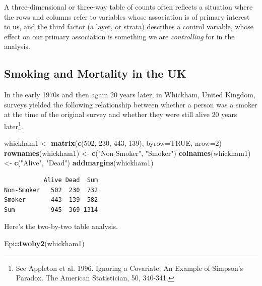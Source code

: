 \documentclass[
]{book}
\newenvironment{Shaded}{\begin{snugshade}}{\end{snugshade}}
\newcommand{\DataTypeTok}[1]{\textcolor[rgb]{0.13,0.29,0.53}{#1}}
\newcommand{\DecValTok}[1]{\textcolor[rgb]{0.00,0.00,0.81}{#1}}
\newcommand{\KeywordTok}[1]{\textcolor[rgb]{0.13,0.29,0.53}{\textbf{#1}}}
\newcommand{\NormalTok}[1]{#1}
\newcommand{\OperatorTok}[1]{\textcolor[rgb]{0.81,0.36,0.00}{\textbf{#1}}}
\newcommand{\OtherTok}[1]{\textcolor[rgb]{0.56,0.35,0.01}{#1}}
\newcommand{\StringTok}[1]{\textcolor[rgb]{0.31,0.60,0.02}{#1}}
\begin{document}
A three-dimensional or three-way table of counts often reflects a situation where the rows and columns refer to variables whose association is of primary interest to us, and the third factor (a layer, or strata) describes a control variable, whose effect on our primary association is something we are \emph{controlling} for in the analysis.

\hypertarget{smoking-and-mortality-in-the-uk}{%
\subsection{Smoking and Mortality in the UK}\label{smoking-and-mortality-in-the-uk}}

In the early 1970s and then again 20 years later, in Whickham, United Kingdom, surveys yielded the following relationship between whether a person was a smoker at the time of the original survey and whether they were still alive 20 years later\footnote{See Appleton et al. 1996. Ignoring a Covariate: An Example of Simpson's Paradox. The American Statistician, 50, 340-341.}.

\begin{Shaded}
\begin{Highlighting}[]
\NormalTok{whickham1 <-}\StringTok{ }\KeywordTok{matrix}\NormalTok{(}\KeywordTok{c}\NormalTok{(}\DecValTok{502}\NormalTok{, }\DecValTok{230}\NormalTok{, }\DecValTok{443}\NormalTok{, }\DecValTok{139}\NormalTok{), }\DataTypeTok{byrow=}\OtherTok{TRUE}\NormalTok{, }\DataTypeTok{nrow=}\DecValTok{2}\NormalTok{)}
\KeywordTok{rownames}\NormalTok{(whickham1) <-}\StringTok{ }\KeywordTok{c}\NormalTok{(}\StringTok{"Non-Smoker"}\NormalTok{, }\StringTok{"Smoker"}\NormalTok{)}
\KeywordTok{colnames}\NormalTok{(whickham1) <-}\StringTok{ }\KeywordTok{c}\NormalTok{(}\StringTok{"Alive"}\NormalTok{, }\StringTok{"Dead"}\NormalTok{)}
\KeywordTok{addmargins}\NormalTok{(whickham1)}
\end{Highlighting}
\end{Shaded}

\begin{verbatim}
           Alive Dead  Sum
Non-Smoker   502  230  732
Smoker       443  139  582
Sum          945  369 1314
\end{verbatim}

Here's the two-by-two table analysis.

\begin{Shaded}
\begin{Highlighting}[]
\NormalTok{Epi}\OperatorTok{::}\KeywordTok{twoby2}\NormalTok{(whickham1)}
\end{Highlighting}
\end{Shaded}
\end{document}
